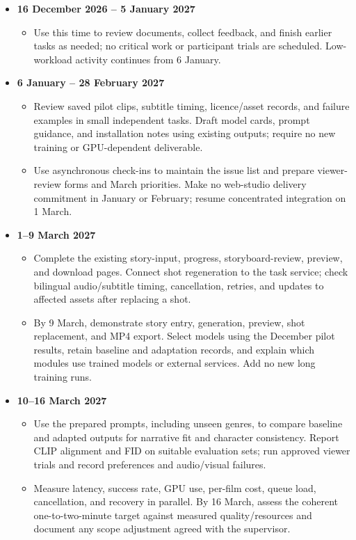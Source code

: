 \documentclass[a4paper,12pt]{article}
\begin{document}
\begin{itemize}
  \item \textbf{16 December 2026 -- 5 January 2027}
    \begin{itemize}
      \item Use this time to review documents, collect feedback, and finish earlier tasks as needed; no critical work or participant trials are scheduled. Low-workload activity continues from 6 January.
    \end{itemize}

  \item \textbf{6 January -- 28 February 2027}
    \begin{itemize}
      \item Review saved pilot clips, subtitle timing, licence/asset records, and failure examples in small independent tasks. Draft model cards, prompt guidance, and installation notes using existing outputs; require no new training or GPU-dependent deliverable.
      \item Use asynchronous check-ins to maintain the issue list and prepare viewer-review forms and March priorities. Make no web-studio delivery commitment in January or February; resume concentrated integration on 1 March.
    \end{itemize}

  \item \textbf{1--9 March 2027}
    \begin{itemize}
      \item Complete the existing story-input, progress, storyboard-review, preview, and download pages. Connect shot regeneration to the task service; check bilingual audio/subtitle timing, cancellation, retries, and updates to affected assets after replacing a shot.
      \item By 9 March, demonstrate story entry, generation, preview, shot replacement, and MP4 export. Select models using the December pilot results, retain baseline and adaptation records, and explain which modules use trained models or external services. Add no new long training runs.
    \end{itemize}

  \item \textbf{10--16 March 2027}
    \begin{itemize}
      \item Use the prepared prompts, including unseen genres, to compare baseline and adapted outputs for narrative fit and character consistency. Report CLIP alignment and FID on suitable evaluation sets; run approved viewer trials and record preferences and audio/visual failures.
      \item Measure latency, success rate, GPU use, per-film cost, queue load, cancellation, and recovery in parallel. By 16 March, assess the coherent one-to-two-minute target against measured quality/resources and document any scope adjustment agreed with the supervisor.
    \end{itemize}


\end{itemize}
\end{document}
